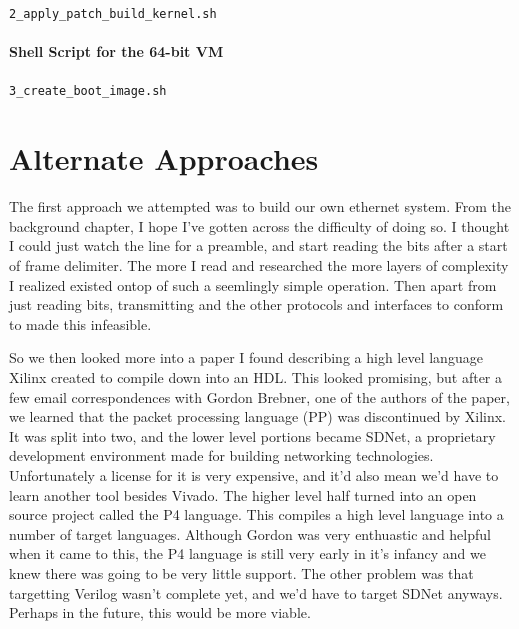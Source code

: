 \documentclass[12pt]{report}
\begin{document}
\texttt{2\_apply\_patch\_build\_kernel.sh}


\subsubsection{Shell Script for the 64-bit VM}
\texttt{3\_create\_boot\_image.sh}


\chapter{Alternate Approaches}
The first approach we attempted was to build our own ethernet system. From the background chapter, I hope I've gotten across the difficulty of doing so. I thought I could just watch the line for a preamble, and start reading the bits after a start of frame delimiter. The more I read and researched the more layers of complexity I realized existed ontop of such a seemlingly simple operation. Then apart from just reading bits, transmitting and the other protocols and interfaces to conform to made this infeasible.

So we then looked more into a paper \cite{pp} I found describing a high level language Xilinx created to compile down into an HDL. This looked promising, but after a few email correspondences with Gordon Brebner, one of the authors of the paper, we learned that the packet processing language (PP) was discontinued by Xilinx. It was split into two, and the lower level portions became SDNet, a proprietary development environment made for building networking technologies. Unfortunately a license for it is very expensive, and it'd also mean we'd have to learn another tool besides Vivado.
The higher level half turned into an open source project called the P4 language.
This compiles a high level language into a number of target languages. Although Gordon was very enthuastic and helpful when it came to this, the P4 language is still very early in it's infancy and we knew there was going to be very little support. The other problem was that targetting Verilog wasn't complete yet, and we'd have to target SDNet anyways. Perhaps in the future, this would be more viable.
\end{document}
